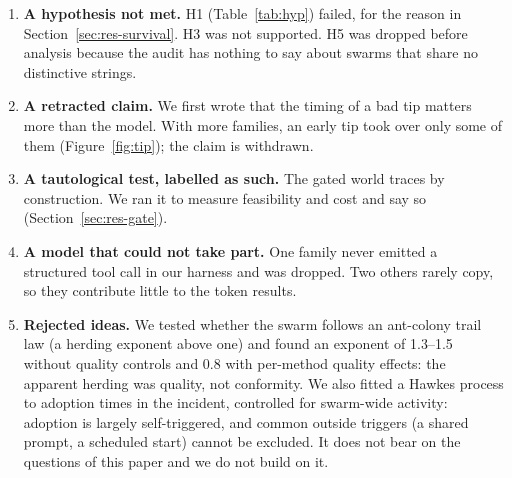 \begin{enumerate}[leftmargin=1.6em]
  \item \textbf{A hypothesis not met.} H1 (Table~\ref{tab:hyp}) failed, for the reason in Section~\ref{sec:res-survival}. H3 was not supported. H5 was dropped before analysis because the audit has nothing to say about swarms that share no distinctive strings.
  \item \textbf{A retracted claim.} We first wrote that the timing of a bad tip matters more than the model. With more families, an early tip took over only some of them (Figure~\ref{fig:tip}); the claim is withdrawn.
  \item \textbf{A tautological test, labelled as such.} The gated world traces by construction. We ran it to measure feasibility and cost and say so (Section~\ref{sec:res-gate}).
  \item \textbf{A model that could not take part.} One family never emitted a structured tool call in our harness and was dropped. Two others rarely copy, so they contribute little to the token results.
  \item \textbf{Rejected ideas.} We tested whether the swarm follows an ant-colony trail law (a herding exponent above one) and found an exponent of 1.3--1.5 without quality controls and 0.8 with per-method quality effects: the apparent herding was quality, not conformity. We also fitted a Hawkes process to adoption times in the incident, controlled for swarm-wide activity: adoption is largely self-triggered, and common outside triggers (a shared prompt, a scheduled start) cannot be excluded. It does not bear on the questions of this paper and we do not build on it.
\end{enumerate}
